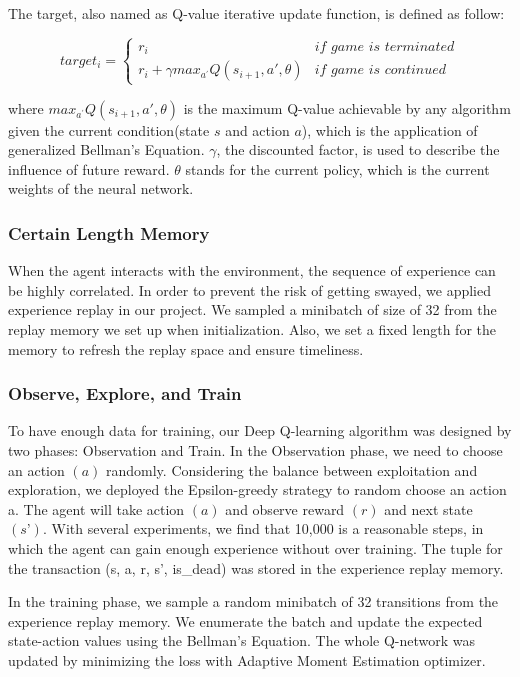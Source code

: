 \documentclass{article}
\begin{document}
The target, also named as Q-value iterative update function, is defined as follow:

\begin{equation}
    target_i = 
    \begin{cases}
    r_i & \textit{if game is terminated}\\
    r_i + \gamma max_{a^{'}}Q(s_{i + 1}, a', \theta) & \textit{if game is continued}
    \end{cases}
\end{equation}

where $max_{a^{'}}Q(s_{i + 1}, a', \theta)$ is the maximum Q-value achievable by any algorithm given the current condition(state $s$ and action $a$), which is the application of generalized Bellman’s Equation. $\gamma$, the discounted factor, is used to describe the influence of future reward. $\theta$ stands for the current policy, which is the current weights of the neural network.

\subsubsection{Certain Length Memory}

When the agent interacts with the environment, the sequence of experience can be highly correlated. In order to prevent the risk of getting swayed, we applied experience replay in our project. We sampled a minibatch of size of 32 from the replay memory we set up when initialization. Also, we set a fixed length for the memory to refresh the replay space and ensure timeliness.

\subsubsection{Observe, Explore, and Train}
To have enough data for training, our Deep Q-learning algorithm was designed by two phases: Observation and Train. In the Observation phase, we need to choose an action $(a)$ randomly. Considering the balance between exploitation and exploration, we deployed the Epsilon-greedy strategy to random choose an action a. The agent will take action $(a)$ and observe reward $(r)$ and next state $(s’)$. With several experiments, we find that 10,000 is a reasonable steps, in which the agent can gain enough experience without over training. The tuple for the transaction (s, a, r, s’, is\_dead) was stored in the experience replay memory. 

In the training phase, we sample a random minibatch of 32 transitions from the experience replay memory. We enumerate the batch and update the expected state-action values using the Bellman’s Equation. The whole Q-network was updated by minimizing the loss with Adaptive Moment Estimation optimizer.
\end{document}
